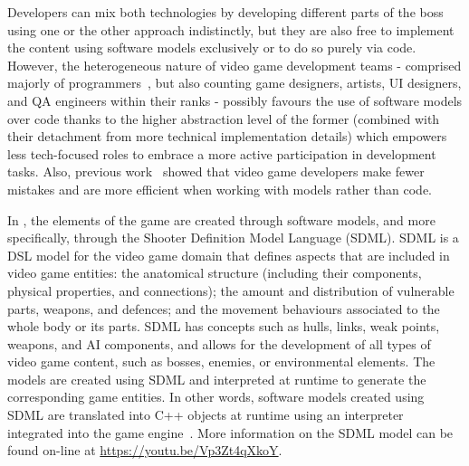Developers can mix both technologies by developing different parts of the boss using one or the other approach indistinctly, but they are also free to implement the content using software models exclusively or to do so purely via code. However, the heterogeneous nature of video game development teams - comprised majorly of programmers~\cite{devNation}, but also counting game designers, artists, UI designers, and QA engineers within their ranks - possibly favours the use of software models over code thanks to the higher abstraction level of the former (combined with their detachment from more technical implementation details) which empowers less tech-focused roles to embrace a more active participation in development tasks.  Also, previous work~\cite{domingo2020evaluating} showed that video game developers make fewer mistakes and are more efficient when working with models rather than code.

In \CaseStudy{}, the elements of the game are created through software models, and more specifically, through the Shooter Definition Model Language (SDML). SDML is a DSL model for the video game domain that defines aspects that are included in video game entities: the anatomical structure (including their components, physical properties, and connections); the amount and distribution of vulnerable parts, weapons, and defences; and the movement behaviours associated to the whole body or its parts. SDML has concepts such as hulls, links, weak points, weapons, and AI components, and allows for the development of all types of video game content, such as bosses, enemies, or environmental elements. The models are created using SDML and interpreted at runtime to generate the corresponding game entities. In other words, software models created using SDML are translated into C++ objects at runtime using an interpreter integrated into the game engine~\cite{blasco2021evolutionary}. More information on the SDML model can be found on-line at \url{https://youtu.be/Vp3Zt4qXkoY}.